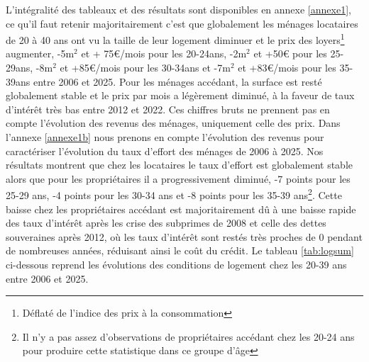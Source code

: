 \documentclass[12pt,a4paper]{article}
\begin{document}
\noindent L’intégralité des tableaux et des résultats sont disponibles en annexe \ref{annexe1}, ce qu’il faut retenir majoritairement c’est que globalement les ménages locataires de 20 à 40 ans ont vu la taille de leur logement diminuer et le prix des loyers\footnote{Déflaté de l'indice des prix à la consommation}  augmenter, -5m$^2$ et + 75€/mois pour les 20-24ans, -2m$^2$ et +50€ pour les 25-29ans, -8m$^2$ et +85€/mois pour les 30-34ans et -7m$^2$ et +83€/mois pour les 35-39ans entre 2006 et 2025. Pour les ménages accédant, la surface est resté globalement stable et le prix par mois a légèrement diminué, à la faveur de taux d’intérêt très bas entre 2012 et 2022. Ces chiffres bruts ne prennent pas en compte l'évolution des revenus des ménages, uniquement celle des prix. Dans l'annexe \ref{annexe1b} nous prenons en compte l'évolution des revenus pour caractériser l'évolution du taux d'effort des ménages de 2006 à 2025. Nos résultats montrent que chez les locataires le taux d'effort est globalement stable alors que pour les propriétaires il a progressivement diminué, -7 points pour les 25-29 ans, -4 points pour les 30-34 ans et -8 points pour les 35-39 ans\footnote{Il n'y a pas assez d'observations de propriétaires accédant chez les 20-24 ans pour produire cette statistique dans ce groupe d'âge}. Cette baisse chez les propriétaires accédant est majoritairement dû à une baisse rapide des taux d'intérêt après les crise des subprimes de 2008 et celle des dettes souveraines après 2012, où les taux d'intérêt sont restés très proches de 0 pendant de nombreuses années, réduisant ainsi le coût du crédit. Le tableau \ref{tab:logsum} ci-dessous reprend les évolutions des conditions de logement chez les 20-39 ans entre 2006 et 2025.  

\bigskip
\end{document}
